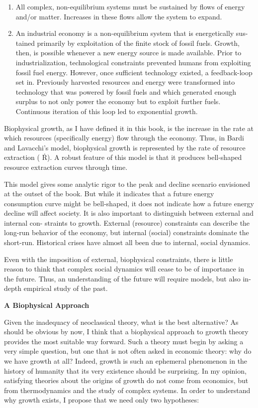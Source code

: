 \documentclass[
]{book}
\begin{document}
\begin{enumerate}
\def\labelenumi{\arabic{enumi}.}
\item
  All complex, non-equilibrium systems must be sustained by flows of energy
  and/or matter. Increases in these flows allow the system to expand.
\item
  An industrial economy is a non-equilibrium system that is energetically sus-
  tained primarily by exploitation of the finite stock of fossil fuels.
  Growth, then, is possible whenever a new energy source is made available. Prior
  to industrialization, technological constraints prevented humans from exploiting
  fossil fuel energy. However, once sufficient technology existed, a feedback-loop set
  in. Previously harvested resources and energy were transformed into technology that
  was powered by fossil fuels and which generated enough surplus to not only power
  the economy but to exploit further fuels. Continuous iteration of this loop led to
  exponential growth.
\end{enumerate}

Biophysical growth, as I have defined it in this book, is the increase in the rate
at which resources (specifically energy) flow through the economy. Thus, in Bardi
and Lavacchi's model, biophysical growth is represented by the rate of resource
extraction ( Ṙ). A robust feature of this model is that it produces bell-shaped resource
extraction curves through time.

This model gives some analytic rigor to the peak and decline scenario envisioned
at the outset of the book. But while it indicates that a future energy consumption
curve might be bell-shaped, it does not indicate how a future energy decline will
affect society. It is also important to distinguish between external and internal con-
straints to growth. External (resource) constraints can describe the long-run behavior
of the economy, but internal (social) constraints dominate the short-run. Historical
crises have almost all been due to internal, social dynamics.

Even with the imposition of external, biophysical constraints, there is
little reason to think that complex social dynamics will cease to be of importance
in the future. Thus, an understanding of the future will require models, but also
in-depth empirical study of the past.

\textbf{A Biophysical Approach}

Given the inadequacy of neoclassical theory, what is the best alternative? As should
be obvious by now, I think that a biophysical approach to growth theory provides
the most suitable way forward. Such a theory must begin by asking a very simple
question, but one that is not often asked in economic theory: why do we have growth
at all? Indeed, growth is such an ephemeral phenomenon in the history of humanity
that its very existence should be surprising. In my opinion, satisfying theories about
the origins of growth do not come from economics, but from thermodynamics and
the study of complex systems. In order to understand why growth exists, I propose
that we need only two hypotheses:
\end{document}
